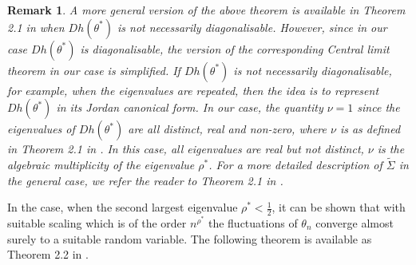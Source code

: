 \documentclass{article}
\numberwithin{equation}{section}
\newtheorem{remark}{Remark}
\newcommand{\1}{\mathbf{1}}
\newcommand{\0}{\mathbf{0}}
\begin{document}
\begin{remark}A more general version of the above theorem is available in Theorem 2.1 in \cite{Zh_2016} when $Dh(\theta^*)$ is not necessarily diagonalisable. However, since in our case $Dh(\theta^*)$ is diagonalisable, the version of the corresponding Central limit theorem in our case is simplified. {If $Dh(\theta^*)$ is not necessarily diagonalisable, for example, when the eigenvalues are repeated, then the idea is to represent $Dh(\theta^*)$ in its Jordan canonical form.} In our case, the quantity $\nu=1$ since the eigenvalues of $Dh(\theta^*)$ are all distinct, real and non-zero, where $\nu$ is as defined in Theorem 2.1 in \cite{Zh_2016}. In this case, all eigenvalues are real but not distinct, $\nu$ is the algebraic multiplicity of the eigenvalue $\rho^*$. For a more detailed description of $\widetilde{\Sigma}$ in the general case, we refer the reader to Theorem 2.1 in \cite{Zh_2016}.
\end{remark}
In the case, when the second largest eigenvalue $\rho^*< \frac{1}{2}$, it can be shown that with suitable scaling which is of the order $n^{\rho^*}$ the fluctuations of $\theta_n$ converge almost surely to a suitable random variable. The following theorem is available as Theorem 2.2 in \cite{Zh_2016}.
\end{document}
